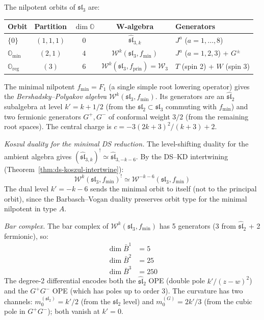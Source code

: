 \begin{computation}
\label{comp:sl3-ds-hierarchy}
The nilpotent orbits of $\mathfrak{sl}_3$ are:
\begin{center}
\renewcommand{\arraystretch}{1.2}
\begin{tabular}{lcccl}
\textbf{Orbit} & \textbf{Partition} & \textbf{$\dim \mathbb{O}$} &
\textbf{W-algebra} & \textbf{Generators} \\
\hline
$\{0\}$ & $(1,1,1)$ & $0$ & $\widehat{\mathfrak{sl}}_{3,k}$ &
$J^a$ ($a = 1,\ldots,8$) \\
$\mathbb{O}_{\min}$ & $(2,1)$ & $4$ &
$\mathcal{W}^k(\mathfrak{sl}_3, f_{\min})$ &
$J^a$ ($a = 1,2,3$) + $G^{\pm}$ \\
$\mathbb{O}_{\mathrm{reg}}$ & $(3)$ & $6$ &
$\mathcal{W}^k(\mathfrak{sl}_3, f_{\mathrm{prin}}) = \mathcal{W}_3$ &
$T$ (spin 2) + $W$ (spin 3)
\end{tabular}
\end{center}

The minimal nilpotent $f_{\min} = F_1$ (a single simple root lowering
operator) gives the \emph{Bershadsky--Polyakov algebra}
$\mathcal{W}^k(\mathfrak{sl}_3, f_{\min})$.  Its generators are an $\widehat{\mathfrak{sl}}_2$ subalgebra at level $k' = k + 1/2$ (from the $\mathfrak{sl}_2 \subset \mathfrak{sl}_3$ commuting with $f_{\min}$) and two fermionic generators $G^+, G^-$ of conformal weight $3/2$ (from the remaining root spaces).
The central charge is $c = -3(2k+3)^2/(k+3) + 2$.

\emph{Koszul duality for the minimal DS reduction.}
The level-shifting duality for the ambient algebra gives
$(\widehat{\mathfrak{sl}}_{3,k})^! \simeq \widehat{\mathfrak{sl}}_{3,-k-6}$.
By the DS--KD intertwining (Theorem~\ref{thm:ds-koszul-intertwine}):
\[
\mathcal{W}^k(\mathfrak{sl}_3, f_{\min})^!
\simeq \mathcal{W}^{-k-6}(\mathfrak{sl}_3, f_{\min})
\]
The dual level $k' = -k-6$ sends the minimal orbit to itself
(not to the principal orbit), since the Barbasch--Vogan duality
preserves orbit type for the minimal nilpotent in type $A$.

\emph{Bar complex.}
The bar complex of $\mathcal{W}^k(\mathfrak{sl}_3, f_{\min})$ has
5 generators (3 from $\widehat{\mathfrak{sl}}_2$ + 2 fermionic), so:
\begin{align}
\dim \bar{B}^1 &= 5 \\
\dim \bar{B}^2 &= 25 \\
\dim \bar{B}^3 &= 250
\end{align}
The degree-2 differential encodes both the $\widehat{\mathfrak{sl}}_2$
OPE (double pole $k'/(z-w)^2$) and the $G^+ G^-$ OPE (which has
poles up to order 3).  The curvature has two channels:
$m_0^{(\mathfrak{sl}_2)} = k'/2$ (from the $\mathfrak{sl}_2$ level)
and $m_0^{(G)} = 2k'/3$ (from the cubic pole in $G^+ G^-$); both vanish at $k' = 0$.
\end{computation}

